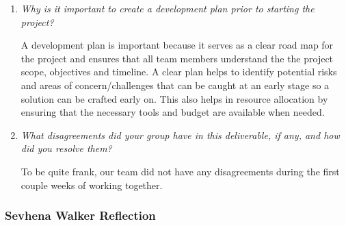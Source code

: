 \documentclass{article}
\begin{document}
\begin{enumerate}
  \item \textit{Why is it important to create a development plan
      prior to starting the
    project?}

    A development plan is important because it serves as a clear road
    map for the project and ensures that all
    team members understand the the project scope, objectives and
    timeline. A clear plan helps to identify potential risks
    and areas of concern/challenges that can be caught at an early
    stage so a solution can be crafted early on. This also helps
    in resource allocation by ensuring that the necessary tools and
    budget are available when needed.

  \item \textit{What disagreements did your group have in this
    deliverable, if any, and how did you resolve them?}

    To be quite frank, our team did not have any disagreements during
    the first couple weeks of working together.

\end{enumerate}

\subsubsection*{Sevhena Walker Reflection}
\end{document}
